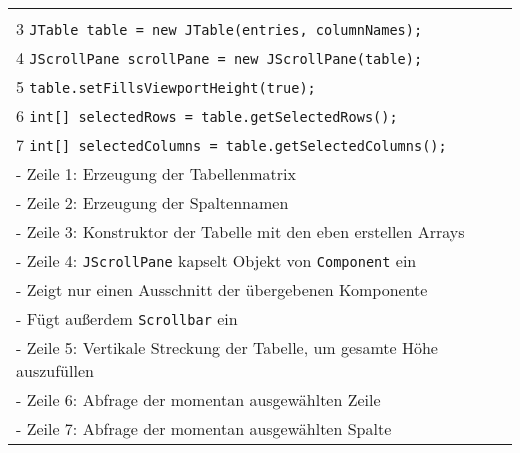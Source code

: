 \begin{longtable}{ | p{} p{} | }
{	\hspace{0.8cm} 2 \hspace{0.1cm} \texttt{Object[] columnNames = ...;} \\
	\hspace{0.8cm} 3 \hspace{0.1cm} \texttt{JTable table = new JTable(entries, columnNames);} \\
	\hspace{0.8cm} 4 \hspace{0.1cm} \texttt{JScrollPane scrollPane = new JScrollPane(table);} \\
	\hspace{0.8cm} 5 \hspace{0.1cm} \texttt{table.setFillsViewportHeight(true);} \\
	\hspace{0.8cm} 6 \hspace{0.1cm} \texttt{int[] selectedRows = table.getSelectedRows();} \\
	\hspace{0.8cm} 7 \hspace{0.1cm} \texttt{int[] selectedColumns = table.getSelectedColumns();} \\
	\hspace{0.6cm} - Zeile 1: Erzeugung der Tabellenmatrix \\
	\hspace{0.6cm} - Zeile 2: Erzeugung der Spaltennamen \\
	\hspace{0.6cm} - Zeile 3: Konstruktor der Tabelle mit den eben erstellen Arrays \\
	\hspace{0.6cm} - Zeile 4: \texttt{JScrollPane} kapselt Objekt von \texttt{Component} ein \\
	\hspace{0.6cm} - Zeigt nur einen Ausschnitt der übergebenen Komponente \\
	\hspace{0.6cm} - Fügt au\ss erdem \texttt{Scrollbar} ein \\
	\hspace{0.6cm} - Zeile 5: Vertikale Streckung der Tabelle, um gesamte Höhe auszufüllen \\
	\hspace{0.6cm} - Zeile 6: Abfrage der momentan ausgewählten Zeile \\
	\hspace{0.6cm} - Zeile 7: Abfrage der momentan ausgewählten Spalte} \\ \hline
	
	
	
	\end{longtable}

